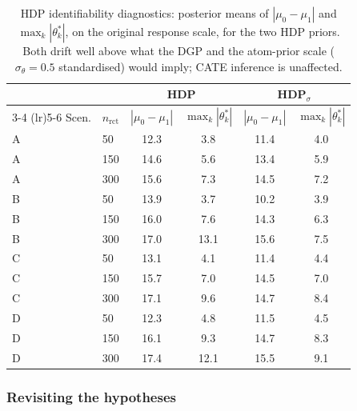 \documentclass[11pt]{article}
\theoremstyle{plain}
\theoremstyle{definition}
\theoremstyle{remark}
\newcommand{\1}{\mathds{1}}
\begin{document}
\begin{table}[tb]
\centering
\small
\caption{HDP identifiability diagnostics: posterior means of
$|\mu_0 - \mu_1|$ and $\max_k |\theta_k^*|$, on the original response
scale, for the two HDP priors. Both drift well above what the DGP and
the atom-prior scale ($\sigma_\theta = 0.5$ standardised) would
imply; CATE inference is unaffected.}
\label{tab:sim-identifiability}
\begin{tabular}{llcccc}
\toprule
& & \multicolumn{2}{c}{HDP} & \multicolumn{2}{c}{HDP$_\sigma$} \\
\cmidrule(lr){3-4} \cmidrule(lr){5-6}
Scen. & $n_{\text{rct}}$ & $|\mu_0 - \mu_1|$ & $\max_k|\theta_k^*|$
                       & $|\mu_0 - \mu_1|$ & $\max_k|\theta_k^*|$ \\
\midrule
A & 50  & 12.3 &  3.8 & 11.4 & 4.0 \\
A & 150 & 14.6 &  5.6 & 13.4 & 5.9 \\
A & 300 & 15.6 &  7.3 & 14.5 & 7.2 \\
B & 50  & 13.9 &  3.7 & 10.2 & 3.9 \\
B & 150 & 16.0 &  7.6 & 14.3 & 6.3 \\
B & 300 & 17.0 & 13.1 & 15.6 & 7.5 \\
C & 50  & 13.1 &  4.1 & 11.4 & 4.4 \\
C & 150 & 15.7 &  7.0 & 14.5 & 7.0 \\
C & 300 & 17.1 &  9.6 & 14.7 & 8.4 \\
D & 50  & 12.3 &  4.8 & 11.5 & 4.5 \\
D & 150 & 16.1 &  9.3 & 14.7 & 8.3 \\
D & 300 & 17.4 & 12.1 & 15.5 & 9.1 \\
\bottomrule
\end{tabular}
\end{table}

\subsubsection*{Revisiting the hypotheses}
\end{document}

